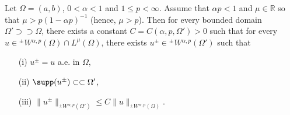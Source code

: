\documentclass[leqno,final]{siamltex}
\numberwithin{equation}{section}
\renewcommand{\(}{\bigl(}
\renewcommand{\)}{\bigr)}
\newcommand{\R}{\mathbb{R}}
\begin{document}
    \begin{lemma}\label{ExtensionOutsideLemma}
        Let $\Omega=(a,b)$, $0 < \alpha <1$ and $1 \leq p < \infty$. Assume that $\alpha p<1$ and $\mu \in \R$ so that $\mu > p(1-\alpha p)^{-1}$ (hence, $\mu>p$). Then for every bounded domain 
        $\Omega ' \supset \supset \Omega$, 
        there exists a constant $C = C(\alpha,p,\Omega') >0$ such that for every $u \in {^{\pm}}{W}{^{\alpha,p}}(\Omega) \cap L^{\mu}(\Omega)$, there exists $u^{\pm} \in {^{\pm}}{W}{^{\alpha,p}}(\Omega')$ such that 
        \begin{enumerate}
            \item[{\rm (i)}] $u^{\pm} = u$ a.e. in $\Omega$,
            \item[{\rm (ii)}] $\supp(u^{\pm})\subset\subset \Omega'$,
            \item[{\rm (iii)}] $\|u^{\pm}\|_{{^{\pm}}{W}{^{\alpha,p}}(\Omega')} \leq C \|u\|_{{^{\pm}}{W}{^{\alpha,p}}(\Omega)}$. 
        \end{enumerate}
    \end{lemma}
    
\end{document}
